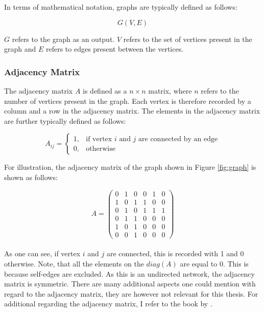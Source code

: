 	\noindent In terms of mathematical notation, graphs are typically defined
	as follows:

	\begin{equation}
		G(V,E)
	\end{equation}

	\noindent $G$ refers to the graph as an output. $V$ refers to the set of 
	vertices present in the graph and $E$ refers to edges present between the 
	vertices. \\

	\subsubsection{Adjacency Matrix}

	The adjacency matrix $A$ is defined as a $n \times n$ matrix, where $n$ refers
	to the number of vertices present in the graph. Each vertex is therefore
	recorded by a column and a row in the adjacency matrix. The elements in the
	adjacency matrix are further typically defined as follows:

	\begin{equation}
		A_{ij} = 
			\begin{cases}
				1, & \text{if vertex $i$ and $j$ are connected by an edge} \\
				0, & \text{otherwise}
			\end{cases}
	\end{equation}
	
	\noindent For illustration, the adjacency matrix of the graph shown in Figure
	\ref{fig:graph} is shown as follows:

	\[ A = 
	\begin{pmatrix}
		0 & 1 & 0 & 0 & 1 & 0 \\
		1 & 0 & 1 & 1 & 0 & 0 \\
		0 & 1 & 0 & 1 & 1 & 1 \\
		0 & 1 & 1 & 0 & 0 & 0 \\
		1 & 0 & 1 & 0 & 0 & 0 \\
		0 & 0 & 1 & 0 & 0 & 0  
	\end{pmatrix}
	\] \\
	
	\noindent As one can see, if vertex $i$ and $j$ are connected, this is recorded with
	1 and 0 otherwise. Note, that all the elements on the $diag(A)$ are equal
	to 0. This is because self-edges are excluded. As this is an undirected
	network, the adjacency matrix is symmetric. There are many additional
	aspects one could mention with regard to the adjacency matrix, they are
	however not relevant for this thesis. For additional regarding the adjacency
	matrix, I refer to the book by \cite{Newman2010}. 

